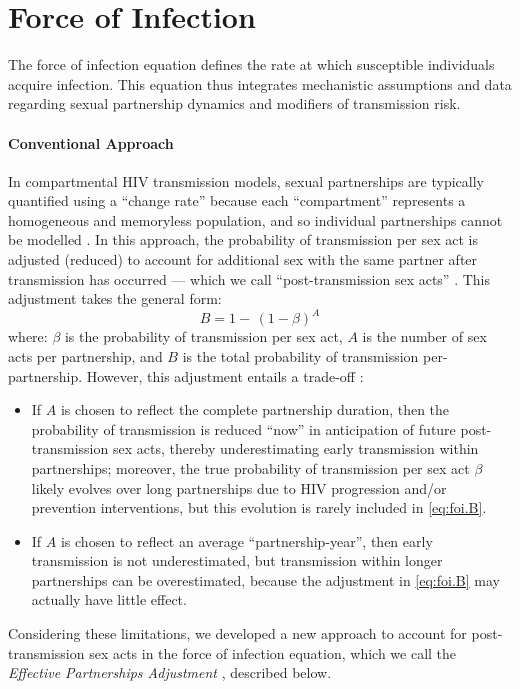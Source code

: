 \section{Force of Infection}\label{foi.prop}
The force of infection equation defines the rate at which susceptible individuals acquire infection.
This equation thus integrates mechanistic assumptions and data regarding
sexual partnership dynamics and modifiers of transmission risk.
\paragraph{Conventional Approach}
In compartmental HIV transmission models,
sexual partnerships are typically quantified using a ``change rate''
because each ``compartment'' represents a homogeneous and memoryless population,
and so individual partnerships cannot be modelled \cite{Rao2021}.
In this approach, the probability of transmission per sex act is adjusted (reduced)
to account for additional sex with the same partner after transmission has occurred
--- which we call ``post-transmission sex acts'' \cite{Knight2022smdm}.
This adjustment takes the general form:
\begin{equation}\label{eq:foi.B}
  B = 1 -\,{(1-\beta)}^A
\end{equation} where:
$\beta$ is the probability of transmission per sex act,
$A$ is the number of sex acts per partnership, and
$B$ is the total probability of transmission per-partnership.
However, this adjustment entails a trade-off \cite{Knight2022smdm}:
\begin{itemize}
  \item If $A$ is chosen to reflect the complete partnership duration, then
  the probability of transmission is reduced ``now''
  in anticipation of future post-transmission sex acts,
  thereby underestimating early transmission within partnerships;
  moreover, the true probability of transmission per sex act $\beta$
  likely evolves over long partnerships due to
  HIV progression and/or prevention interventions,
  but this evolution is rarely included in \eqref{eq:foi.B}.
  \item If $A$ is chosen to reflect an average ``partnership-year'', then
  early transmission is not underestimated,
  but transmission within longer partnerships can be overestimated,
  because the adjustment in \eqref{eq:foi.B} may actually have little effect.
\end{itemize}
Considering these limitations, we developed
a new approach to account for post-transmission sex acts in the force of infection equation,
which we call the \emph{Effective Partnerships Adjustment} \cite{Knight2022smdm}, described below.
